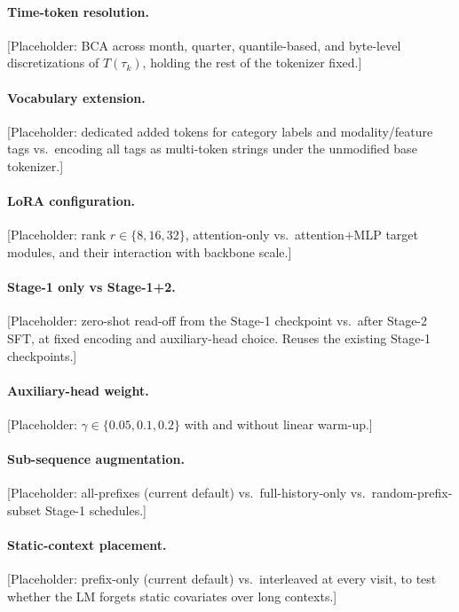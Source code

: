 \documentclass{article}
\begin{document}
\paragraph{Time-token resolution.}
[Placeholder: BCA across month, quarter, quantile-based, and byte-level discretizations of $T(\tau_k)$, holding the rest of the tokenizer fixed.]

\paragraph{Vocabulary extension.}
[Placeholder: dedicated added tokens for category labels and modality/feature tags vs.\ encoding all tags as multi-token strings under the unmodified base tokenizer.]

\paragraph{LoRA configuration.}
[Placeholder: rank $r \in \{8, 16, 32\}$, attention-only vs.\ attention$+$MLP target modules, and their interaction with backbone scale.]

\paragraph{Stage-1 only vs Stage-1+2.}
[Placeholder: zero-shot read-off from the Stage-1 checkpoint vs.\ after Stage-2 SFT, at fixed encoding and auxiliary-head choice. Reuses the existing Stage-1 checkpoints.]

\paragraph{Auxiliary-head weight.}
[Placeholder: $\gamma \in \{0.05, 0.1, 0.2\}$ with and without linear warm-up.]

\paragraph{Sub-sequence augmentation.}
[Placeholder: all-prefixes (current default) vs.\ full-history-only vs.\ random-prefix-subset Stage-1 schedules.]

\paragraph{Static-context placement.}
[Placeholder: prefix-only (current default) vs.\ interleaved at every visit, to test whether the LM forgets static covariates over long contexts.]
\end{document}

